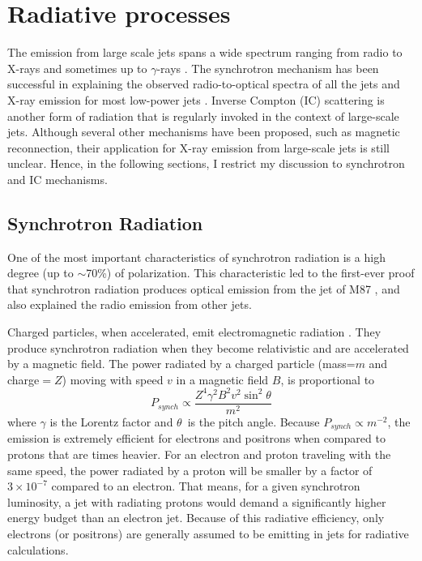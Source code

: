 \section{Radiative processes \label{sec:radative_processes}}
The emission from large scale jets spans a wide spectrum ranging from radio to X-rays \citep[e.g., ][]{harris2002x,worrall2009x} and sometimes up to $\gamma$-rays \citep[e.g.,][]{Meyer_2019,2020Natur.582..356H}. The synchrotron mechanism has been successful in explaining the observed radio-to-optical spectra of all the jets and X-ray emission for most low-power jets \citep[e.g.,][]{2001MNRAS.326.1499H,2002ApJ...564..683M}. Inverse Compton (IC) scattering is another form of radiation that is regularly invoked in the context of large-scale jets. Although several other mechanisms have been proposed, such as magnetic reconnection, their application for X-ray emission from large-scale jets is still unclear. Hence, in the following sections, I restrict my discussion to synchrotron and IC mechanisms.


\subsection{Synchrotron Radiation}
One of the most important characteristics of synchrotron radiation is a high degree (up to $\sim$70\%) of polarization. This characteristic led to the first-ever proof that synchrotron radiation produces optical emission from the jet of M87 \citep{baade1956polarization}, and also explained the radio emission from other jets.

 Charged particles, when accelerated, emit electromagnetic radiation  \cite[for a review, see][]{longair_2011}. They produce synchrotron radiation when they become relativistic and are accelerated by a magnetic field. The  power radiated by a charged particle (mass=$m$ and charge$=Z$) moving with speed $v$ in a magnetic field $B$, is proportional to 
\begin{equation}
      P_{synch} \propto \frac{Z^4\gamma^2B^2v^2 \sin^2\theta}{m^2}
\end{equation}
 where $\gamma$ is the Lorentz factor and $\theta$~is the pitch angle. Because $P_{synch}\propto m^{-2}$, the emission is extremely efficient for electrons and positrons when compared to protons that are  times heavier. For an electron and proton traveling with the same speed, the power radiated by a proton will be smaller by a factor of $3\times10^{-7}$ compared to an electron. That means, for a given synchrotron luminosity, a jet with radiating protons would demand a significantly higher energy budget than an electron jet. Because of this radiative efficiency, only electrons (or positrons) are generally assumed to be emitting in jets for radiative calculations.
 
